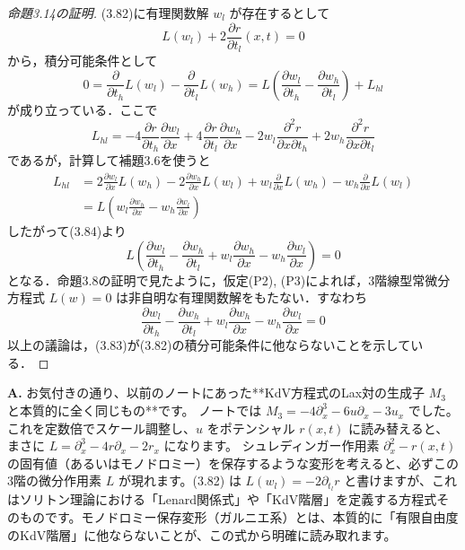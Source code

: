 \begin{story}
\begin{proof}[命題3.14の証明]
(3.82)に有理関数解 $w_l$ が存在するとして
\begin{equation*}
    L(w_l) + 2\frac{\partial r}{\partial t_l}(x,t) = 0
\end{equation*}
から，積分可能条件として
\begin{equation}
    0 = \frac{\partial}{\partial t_h}L(w_l) - \frac{\partial}{\partial t_l}L(w_h) = L\left( \frac{\partial w_l}{\partial t_h} - \frac{\partial w_h}{\partial t_l} \right) + L_{hl} \label{eq:3.84}
\end{equation}
が成り立っている．ここで
\begin{equation*}
    L_{hl} = -4\frac{\partial r}{\partial t_h}\frac{\partial w_l}{\partial x} + 4\frac{\partial r}{\partial t_l}\frac{\partial w_h}{\partial x} - 2w_l\frac{\partial^2 r}{\partial x \partial t_h} + 2w_h\frac{\partial^2 r}{\partial x \partial t_l}
\end{equation*}
であるが，計算して補題3.6を使うと
\begin{align*}
    L_{hl} &= 2\frac{\partial w_l}{\partial x}L(w_h) - 2\frac{\partial w_h}{\partial x}L(w_l) + w_l\frac{\partial}{\partial x}L(w_h) - w_h\frac{\partial}{\partial x}L(w_l) \\
    &= L\left( w_l\frac{\partial w_h}{\partial x} - w_h\frac{\partial w_l}{\partial x} \right)
\end{align*}
したがって(3.84)より
\begin{equation*}
    L\left( \frac{\partial w_l}{\partial t_h} - \frac{\partial w_h}{\partial t_l} + w_l\frac{\partial w_h}{\partial x} - w_h\frac{\partial w_l}{\partial x} \right) = 0
\end{equation*}
となる．命題3.8の証明で見たように，仮定(P2), (P3)によれば，3階線型常微分方程式 $L(w)=0$ は非自明な有理関数解をもたない．すなわち
\begin{equation*}
    \frac{\partial w_l}{\partial t_h} - \frac{\partial w_h}{\partial t_l} + w_l\frac{\partial w_h}{\partial x} - w_h\frac{\partial w_l}{\partial x} = 0
\end{equation*}
以上の議論は，(3.83)が(3.82)の積分可能条件に他ならないことを示している．
\end{proof}

\end{story}

\begin{Q}
\textbf{A.} お気付きの通り、以前のノートにあった**KdV方程式のLax対の生成子 $M_3$ と本質的に全く同じもの**です。
ノートでは $M_3 = -4\partial_x^3 - 6u\partial_x - 3u_x$ でした。これを定数倍でスケール調整し、$u$ をポテンシャル $r(x,t)$ に読み替えると、まさに $L = \partial_x^3 - 4r\partial_x - 2r_x$ になります。
シュレディンガー作用素 $\partial_x^2 - r(x,t)$ の固有値（あるいはモノドロミー）を保存するような変形を考えると、必ずこの3階の微分作用素 $L$ が現れます。(3.82) は $L(w_l) = -2\partial_{t_l}r$ と書けますが、これはソリトン理論における「Lenard関係式」や「KdV階層」を定義する方程式そのものです。モノドロミー保存変形（ガルニエ系）とは、本質的に「有限自由度のKdV階層」に他ならないことが、この式から明確に読み取れます。
\end{Q}

